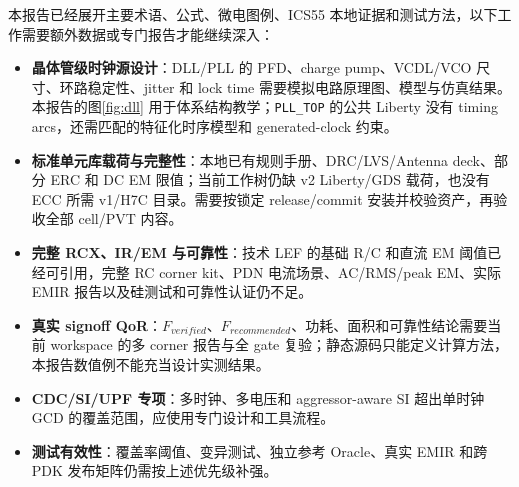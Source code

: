 \documentclass[UTF8,a4paper,11pt,fontset=fandol]{ctexart}
\numberwithin{equation}{section}
\newcommand{\code}[1]{\nolinkurl{#1}}
\begin{document}
本报告已经展开主要术语、公式、微电图例、ICS55 本地证据和测试方法，以下工作需要额外数据或专门报告才能继续深入：
\begin{itemize}
  \item \textbf{晶体管级时钟源设计}：DLL/PLL 的 PFD、charge pump、VCDL/VCO 尺寸、环路稳定性、jitter 和 lock time 需要模拟电路原理图、模型与仿真结果。本报告的图\ref{fig:dll} 用于体系结构教学；\code{PLL_TOP} 的公共 Liberty 没有 timing arcs，还需匹配的特征化时序模型和 generated-clock 约束。
  \item \textbf{标准单元库载荷与完整性}：本地已有规则手册、DRC/LVS/Antenna deck、部分 ERC 和 DC EM 限值；当前工作树仍缺 v2 Liberty/GDS 载荷，也没有 ECC 所需 v1/H7C 目录。需要按锁定 release/commit 安装并校验资产，再验收全部 cell/PVT 内容。
  \item \textbf{完整 RCX、IR/EM 与可靠性}：技术 LEF 的基础 R/C 和直流 EM 阈值已经可引用，完整 RC corner kit、PDN 电流场景、AC/RMS/peak EM、实际 EMIR 报告以及硅测试和可靠性认证仍不足。
  \item \textbf{真实 signoff QoR}：$F_{verified}$、$F_{recommended}$、功耗、面积和可靠性结论需要当前 workspace 的多 corner 报告与全 gate 复验；静态源码只能定义计算方法，本报告数值例不能充当设计实测结果。
  \item \textbf{CDC/SI/UPF 专项}：多时钟、多电压和 aggressor-aware SI 超出单时钟 GCD 的覆盖范围，应使用专门设计和工具流程。
  \item \textbf{测试有效性}：覆盖率阈值、变异测试、独立参考 Oracle、真实 EMIR 和跨 PDK 发布矩阵仍需按上述优先级补强。
\end{itemize}
\end{document}
